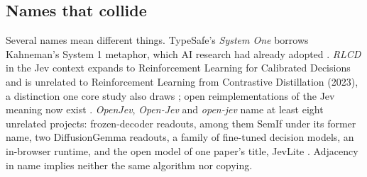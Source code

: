 \subsection{Names that collide}

Several names mean different things. TypeSafe's \emph{System One} borrows Kahneman's System 1 metaphor, which AI research had already adopted \citep{arxiv2010_06002,arxiv2502_17419}. \emph{RLCD} in the Jev context expands to Reinforcement Learning for Calibrated Decisions and is unrelated to Reinforcement Learning from Contrastive Distillation (2023), a distinction one core study also draws \citep{arxiv2609_24574}; open reimplementations of the Jev meaning now exist \citep{arxiv2609_38850,arxiv2610_02486}. \emph{OpenJev}, \emph{Open-Jev} and \emph{open-jev} name at least eight unrelated projects: frozen-decoder readouts, among them SemIf under its former name, two DiffusionGemma readouts, a family of fine-tuned decision models, an in-browser runtime, and the open model of one paper's title, JevLite \citep{gh_theoleecj_semif,gh_daseinlabs_open_jev,gh_zhihz_openjev,gh_razorback16_openjev,gh_joshuasp_open_jev,gh_zefan_cai_open_jev,gh_nico_martin_open_jev,arxiv2609_23959}. Adjacency in name implies neither the same algorithm nor copying.
